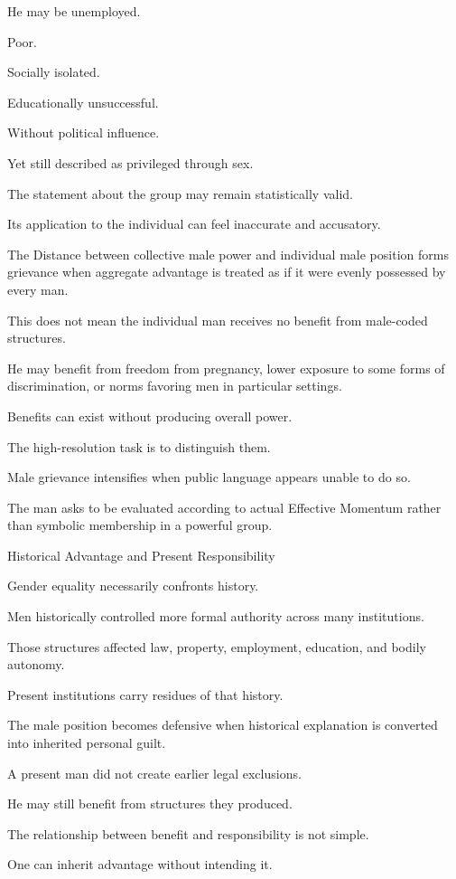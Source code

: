 He may be unemployed.

Poor.

Socially isolated.

Educationally unsuccessful.

Without political influence.

Yet still described as privileged through sex.

The statement about the group may remain statistically valid.

Its application to the individual can feel inaccurate and accusatory.

The Distance between collective male power and individual male position forms grievance when aggregate advantage is treated as if it were evenly possessed by every man.

This does not mean the individual man receives no benefit from male-coded structures.

He may benefit from freedom from pregnancy, lower exposure to some forms of discrimination, or norms favoring men in particular settings.

Benefits can exist without producing overall power.

The high-resolution task is to distinguish them.

Male grievance intensifies when public language appears unable to do so.

The man asks to be evaluated according to actual Effective Momentum rather than symbolic membership in a powerful group.

Historical Advantage and Present Responsibility

Gender equality necessarily confronts history.

Men historically controlled more formal authority across many institutions.

Those structures affected law, property, employment, education, and bodily autonomy.

Present institutions carry residues of that history.

The male position becomes defensive when historical explanation is converted into inherited personal guilt.

A present man did not create earlier legal exclusions.

He may still benefit from structures they produced.

The relationship between benefit and responsibility is not simple.

One can inherit advantage without intending it.

